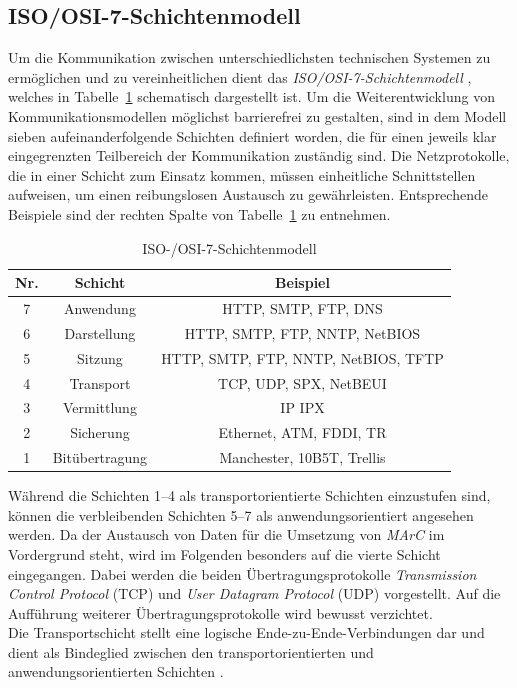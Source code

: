 \subsection{ISO/OSI-7-Schichtenmodell}\label{sec:Netzwerk}
Um die Kommunikation zwischen unterschiedlichsten technischen Systemen zu ermöglichen und zu vereinheitlichen dient das \textit{ISO/OSI-7-Schichtenmodell} \cite{ITU}, welches in Tabelle~\ref{tab:Schichtenmodell} schematisch dargestellt ist. Um die Weiterentwicklung von Kommunikationsmodellen möglichst barrierefrei zu gestalten, sind in dem Modell sieben aufeinanderfolgende Schichten definiert worden, die für einen jeweils klar eingegrenzten Teilbereich der Kommunikation zuständig sind. Die Netzprotokolle, die in einer Schicht zum Einsatz kommen, müssen einheitliche Schnittstellen aufweisen, um einen reibungslosen Austausch zu gewährleisten. Entsprechende Beispiele sind der rechten Spalte von Tabelle~\ref{tab:Schichtenmodell} zu entnehmen.\\

\begin{table}
	\centering
	\renewcommand{\arraystretch}{1.4}
	\begin{tabular}{|c|c|c|}
		\hline
		\Absatzbox{}
		\textbf{Nr.} & \textbf{Schicht}&\textbf{Beispiel}\\
		\hline
		7 & Anwendung &  HTTP, SMTP, FTP, DNS\\
		\hline
		6 & Darstellung & HTTP, SMTP, FTP, NNTP, NetBIOS\\
		\hline
		5 & Sitzung& HTTP, SMTP, FTP, NNTP, NetBIOS, TFTP\\
		\hline
		4 & Transport & TCP, UDP, SPX, NetBEUI\\
		\hline
		3 & Vermittlung& IP IPX\\
		\hline
		2 & Sicherung & Ethernet, ATM, FDDI, TR\\
		\hline
		1 & Bitübertragung & Manchester, 10B5T, Trellis\\
		\hline
	\end{tabular}
	\caption{ISO-/OSI-7-Schichtenmodell}
	\label{tab:Schichtenmodell}
\end{table}

Während die Schichten 1--4 als transportorientierte Schichten einzustufen sind, können die verbleibenden Schichten 5--7 als anwendungsorientiert angesehen werden. Da der Austausch von Daten für die Umsetzung von \textit{MArC} im Vordergrund steht, wird im Folgenden besonders auf die vierte Schicht eingegangen. Dabei werden die beiden Übertragungsprotokolle \textit{Transmission Control Protocol} (TCP) und \textit{User Datagram Protocol} (UDP) vorgestellt. Auf die Aufführung weiterer Übertragungsprotokolle wird bewusst verzichtet.\\
Die Transportschicht stellt eine logische Ende-zu-Ende-Verbindungen dar und dient als Bindeglied zwischen den transportorientierten und anwendungsorientierten Schichten \cite{ITU}.

